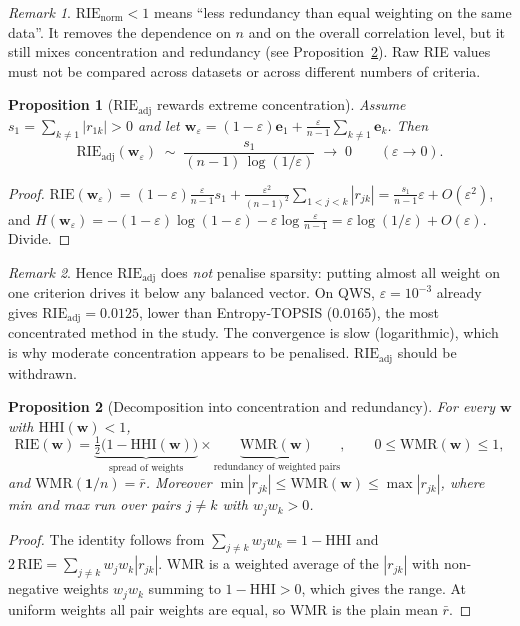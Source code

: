 \documentclass[11pt]{article}
\newtheorem{proposition}{Proposition}
\theoremstyle{definition}
\theoremstyle{remark}
\newtheorem{remark}{Remark}
\begin{document}
\begin{remark}
$\mathrm{RIE}_{\mathrm{norm}}<1$ means ``less redundancy than equal weighting on the same data''.
It removes the dependence on $n$ and on the overall correlation level, but it still mixes
concentration and redundancy (see Proposition~\ref{p:decomp}). Raw RIE values must not be compared
across datasets or across different numbers of criteria.
\end{remark}

\begin{proposition}[$\mathrm{RIE}_{\mathrm{adj}}$ rewards extreme concentration]\label{p:adj}
Assume $s_1=\sum_{k\ne1}|r_{1k}|>0$ and let
$\mathbf{w}_\varepsilon=(1-\varepsilon)\mathbf{e}_1+\frac{\varepsilon}{n-1}\sum_{k\ne1}\mathbf{e}_k$. Then
\[
\mathrm{RIE}_{\mathrm{adj}}(\mathbf{w}_\varepsilon)\;\sim\;\frac{s_1}{(n-1)\,\log(1/\varepsilon)}\;\longrightarrow\;0
\qquad(\varepsilon\to0).
\]
\end{proposition}
\begin{proof}
$\mathrm{RIE}(\mathbf{w}_\varepsilon)=(1-\varepsilon)\frac{\varepsilon}{n-1}s_1+\frac{\varepsilon^2}{(n-1)^2}\sum_{1<j<k}|r_{jk}|
=\frac{s_1}{n-1}\varepsilon+O(\varepsilon^2)$, and
$H(\mathbf{w}_\varepsilon)=-(1-\varepsilon)\log(1-\varepsilon)-\varepsilon\log\frac{\varepsilon}{n-1}
=\varepsilon\log(1/\varepsilon)+O(\varepsilon)$. Divide.
\end{proof}

\begin{remark}
Hence $\mathrm{RIE}_{\mathrm{adj}}$ does \emph{not} penalise sparsity: putting almost all weight on one
criterion drives it below any balanced vector. On QWS, $\varepsilon=10^{-3}$ already gives
$\mathrm{RIE}_{\mathrm{adj}}=0.0125$, lower than Entropy-TOPSIS ($0.0165$), the most concentrated
method in the study. The convergence is slow (logarithmic), which is why moderate concentration
appears to be penalised. $\mathrm{RIE}_{\mathrm{adj}}$ should be withdrawn.
\end{remark}

\begin{proposition}[Decomposition into concentration and redundancy]\label{p:decomp}
For every $\mathbf{w}$ with $\mathrm{HHI}(\mathbf{w})<1$,
\[
\mathrm{RIE}(\mathbf{w})=\underbrace{\tfrac12\bigl(1-\mathrm{HHI}(\mathbf{w})\bigr)}_{\text{spread of weights}}\times
\underbrace{\mathrm{WMR}(\mathbf{w})}_{\text{redundancy of weighted pairs}},
\qquad 0\le\mathrm{WMR}(\mathbf{w})\le 1,
\]
and $\mathrm{WMR}(\mathbf{1}/n)=\bar r$.
Moreover $\min|r_{jk}|\le\mathrm{WMR}(\mathbf{w})\le\max|r_{jk}|$, where min and max run over pairs
$j\ne k$ with $w_jw_k>0$.
\end{proposition}
\begin{proof}
The identity follows from $\sum_{j\ne k}w_jw_k=1-\mathrm{HHI}$ and $2\,\mathrm{RIE}=\sum_{j\ne k}w_jw_k|r_{jk}|$.
WMR is a weighted average of the $|r_{jk}|$ with non-negative weights $w_jw_k$ summing to
$1-\mathrm{HHI}>0$, which gives the range. At uniform weights all pair weights are equal, so WMR is the plain mean $\bar r$.
\end{proof}
\end{document}
